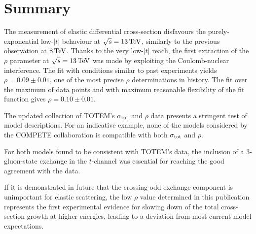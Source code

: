 \section{Summary}
\label{sec:summary}

The measurement of elastic differential cross-section disfavours the purely-exponential low-$|t|$ behaviour at $\sqrt s = 13\,{\rm TeV}$, similarly to the previous observation at $8\,{\rm TeV}$. Thanks to the very low-$|t|$ reach, the first extraction of the $\rho$ parameter at $\sqrt s = 13\,{\rm TeV}$ was made by exploiting the Coulomb-nuclear interference. The fit with conditions similar to past experiments yields $\rho = 0.09 \pm 0.01$, one of the most precise $\rho$ determinations in history. The fit over the maximum of data points and with maximum reasonable flexibility of the fit function gives $\rho = 0.10 \pm 0.01$.

The updated collection of TOTEM's $\sigma_{\rm tot}$ and $\rho$ data presents a stringent test of model descriptions. For an indicative example, none of the models considered by the COMPETE collaboration is compatible with both $\sigma_{\rm tot}$ and $\rho$.

For both models found to be consistent with TOTEM's data, the inclusion of a 3-gluon-state exchange in the $t$-channel was essential for reaching the good agreement with the data.

If it is demonstrated in future that the crossing-odd exchange component is unimportant for elastic scattering, the low $\rho$ value determined in this publication represents the first experimental evidence for slowing down of the total cross-section growth at higher energies, leading to a deviation from most current model expectations.
